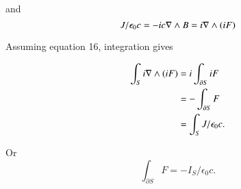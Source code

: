 and
\begin{equation*}
J/\epsilon_0 c = -i c \nabla \wedge B = i \nabla \wedge (iF)
\end{equation*}

Assuming equation 16, integration gives

\begin{align*}
\int_S i \nabla \wedge (iF) 
&= i \int_{\partial S} iF \\
&= -\int_{\partial S} F \\
&= \int_S J/\epsilon_0 c.
\end{align*}

Or
\begin{equation*}
\int_{\partial S} F = -I_S/\epsilon_0 c.
\end{equation*}

